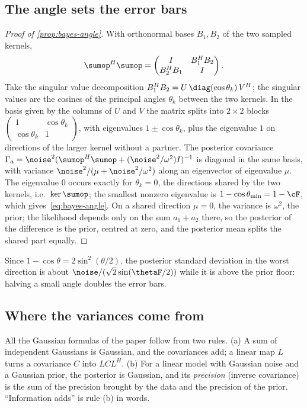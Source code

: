 \subsection{The angle sets the error bars}\label{sm:proof-bayes}
\begin{proof}[Proof of \cref{prop:bayes-angle}]
With orthonormal bases $B_1,B_2$ of the two sampled kernels,
\[
  \sumop^H\sumop=\begin{pmatrix}I&B_1^HB_2\\ B_2^HB_1&I\end{pmatrix}.
\]
Take the singular value decomposition $B_1^HB_2=U\,\diag(\cos\theta_k)\,V^H$; the singular values are the cosines of the
principal angles $\theta_k$ between the two kernels. In the basis given by the columns of $U$ and $V$ the matrix splits into
$2\times2$ blocks $\left(\begin{smallmatrix}1&\cos\theta_k\\ \cos\theta_k&1\end{smallmatrix}\right)$, with eigenvalues
$1\pm\cos\theta_k$, plus the eigenvalue $1$ on directions of the larger kernel without a partner. The posterior covariance
$\Gamma_a=\noise^2(\sumop^H\sumop+(\noise^2/\omega^2)I)^{-1}$ is diagonal in the same basis, with variance
$\noise^2/(\mu+\noise^2/\omega^2)$ along an eigenvector of eigenvalue $\mu$. The eigenvalue $0$ occurs exactly for
$\theta_k=0$, the directions shared by the two kernels, i.e.\ $\ker\sumop$; the smallest nonzero eigenvalue is
$1-\cos\theta_{\min}=1-\cF$, which gives~\eqref{eq:bayes-angle}. On a shared direction $\mu=0$, the variance is $\omega^2$,
the prior; the likelihood depends only on the sum $a_1+a_2$ there, so the posterior of the difference is the prior,
centred at zero, and the posterior mean splits the shared part equally.
\end{proof}
Since $1-\cos\theta=2\sin^2(\theta/2)$, the posterior standard deviation in the worst direction is about
$\noise/(\sqrt2\sin(\thetaF/2))$ while it is above the prior floor: halving a small angle doubles the error bars.

\subsection{Where the variances come from}\label{sm:variances}
All the Gaussian formulas of the paper follow from two rules. (a) A sum of independent Gaussians is Gaussian, and the
covariances add; a linear map $L$ turns a covariance $C$ into $LCL^H$. (b) For a linear model with Gaussian noise and a
Gaussian prior, the posterior is Gaussian, and its \emph{precision} (inverse covariance) is the sum of the precision
brought by the data and the precision of the prior. ``Information adds'' is rule (b) in words.

